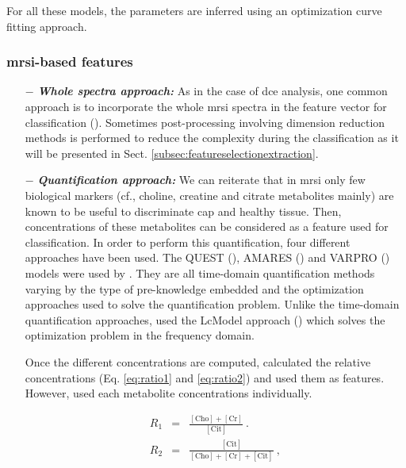 \begin{enumerate}[leftmargin=*]
For all these models, the parameters are inferred using an optimization curve fitting approach.

\end{enumerate}

\subsubsection{\ac{mrsi}-based features}

\begin{enumerate}[leftmargin=*]

\item[$-$] \textbf{\textit{Whole spectra approach:}} As in the case of \ac{dce} analysis, one common approach is to incorporate the whole \ac{mrsi} spectra in the feature vector for classification (\cite{Kelm2007,Parfait2012,Tiwari2007,Tiwari2009,Tiwari2013,Tiwari2009a,Tiwari2010,Viswanath2008a,Matulewicz2013}). Sometimes post-processing involving dimension reduction methods is performed to reduce the complexity during the classification as it will be presented in Sect. \ref{subsec:featureselectionextraction}.

\item[$-$] \textbf{\textit{Quantification approach:}} We can reiterate that in \ac{mrsi} only few biological markers (cf., choline, creatine and citrate metabolites mainly) are known to be useful to discriminate \ac{cap} and healthy tissue. Then, concentrations of these metabolites can be considered as a feature used for classification. In order to perform this quantification, four different approaches have been used. The QUEST (\cite{Ratiney2005}), AMARES (\cite{Vanhamme1997}) and VARPRO (\cite{Coleman1993}) models were used by \cite{Kelm2007}. They are all time-domain quantification methods varying by the type of pre-knowledge embedded and the optimization approaches used to solve the quantification problem. Unlike the time-domain quantification approaches, \cite{Parfait2012} used the LcModel approach (\cite{Provencher1993}) which solves the optimization problem in the frequency domain.

Once the different concentrations are computed, \cite{Kelm2007} calculated the relative concentrations (Eq. \eqref{eq:ratio1} and \eqref{eq:ratio2}) and used them as features. However, \cite{Parfait2012} used each metabolite concentrations individually.

\begin{eqnarray}
	R_1 & = & \frac{ [ \text{Cho} ] + [ \text{Cr} ]}{[ \text{Cit} ]} \ . \label{eq:ratio1} \\
	R_2 & = & \frac{[ \text{Cit} ]}{[\text{Cho}]+[\text{Cr}]+[\text{Cit}]} \ , \label{eq:ratio2}
\end{eqnarray}


\end{enumerate}
